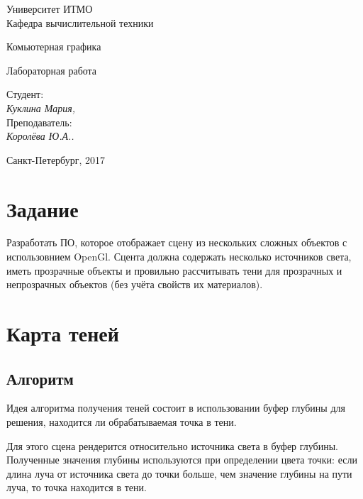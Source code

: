 \documentclass[12pt, a4paper] {ncc}
\begin{document}
\setcounter{figure}{0}
\frenchspacing
\pagestyle{empty}
\begin{center}
                            Университет ИТМО    \\
                        Кафедра вычислительной техники

                    Комьютерная графика
\end{center}
\begin{center}
                            Лабораторная работа
\end{center}
\begin{flushright}
                                    Студент:\\
                                    {\it Куклина Мария,}\\
                                    Преподаватель: \\
                                    {\it Королёва Ю.А..}
\end{flushright}
\begin{center}
                             Санкт-Петербург, 2017
\end{center}
\newpage

\section{Задание}
	Разработать ПО, которое отображает сцену из нескольких сложных объектов с использовнием
	OpenGl. Сцента должна содержать несколько источников света, иметь прозрачные объекты и
	провильно рассчитывать тени для прозрачных и непрозрачных объектов (без учёта свойств
	их материалов).

\section{Карта теней}
	\subsection{Алгоритм}
		Идея алгоритма получения теней состоит в использовании буфер глубины для решения,
		находится ли обрабатываемая точка в тени.
	
		Для этого сцена рендерится относительно источника света в буфер глубины. Полученные
		значения глубины используются при определении цвета точки: если длина луча от источника
		света до точки больше, чем значение глубины на пути луча, то точка находится в тени.
\end{document}
